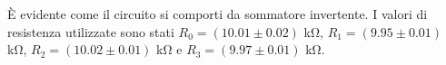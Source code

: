 È evidente come il circuito si comporti da sommatore invertente. I valori di resistenza utilizzate sono stati $R_0=(10.01\pm0.02)$ \si{\kilo\ohm}, $R_1=(9.95\pm0.01)$ \si{\kilo\ohm}, $R_2=(10.02\pm 0.01)$ \si{\kilo\ohm} e $R_3=(9.97\pm0.01)$ \si{\kilo\ohm}. \phantom{xxxxxxxxxxxxxxxxxxxxxxxxxxxxxxxxxxxxxxxx}